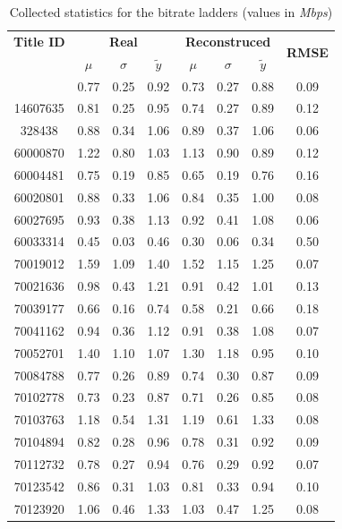 \begin{small}
\begin{longtable}{|c|c c c|c c c|c|}
    \caption{Collected statistics for the bitrate ladders (values in
    \emph{Mbps})}\label{tab:bitrate_ladders_stats}\\
\hline
\textbf{Title ID} &
\multicolumn{3}{c|}{\textbf{Real}} &
\multicolumn{3}{c|}{\textbf{Reconstruced}} &
\multirow{2}{*}{\textbf{RMSE}} \\
& $\mu$ & $\sigma$ & $\tilde{y}$ & $\mu$ & $\sigma$ & $\tilde{y}$ & \\
\hline
\endhead
\hline
\endfoot
1151721 & 0.77 & 0.25 & 0.92 & 0.73 & 0.27 & 0.88 & 0.09 \\
14607635 & 0.81 & 0.25 & 0.95 & 0.74 & 0.27 & 0.89 & 0.12 \\
328438 & 0.88 & 0.34 & 1.06 & 0.89 & 0.37 & 1.06 & 0.06 \\
60000870 & 1.22 & 0.80 & 1.03 & 1.13 & 0.90 & 0.89 & 0.12 \\
60004481 & 0.75 & 0.19 & 0.85 & 0.65 & 0.19 & 0.76 & 0.16 \\
60020801 & 0.88 & 0.33 & 1.06 & 0.84 & 0.35 & 1.00 & 0.08 \\
60027695 & 0.93 & 0.38 & 1.13 & 0.92 & 0.41 & 1.08 & 0.06 \\
\rowcolor{lightgray}60033314 & 0.45 & 0.03 & 0.46 & 0.30 & 0.06 & 0.34 & 0.50 \\
70019012 & 1.59 & 1.09 & 1.40 & 1.52 & 1.15 & 1.25 & 0.07 \\
70021636 & 0.98 & 0.43 & 1.21 & 0.91 & 0.42 & 1.01 & 0.13 \\
70039177 & 0.66 & 0.16 & 0.74 & 0.58 & 0.21 & 0.66 & 0.18 \\
70041162 & 0.94 & 0.36 & 1.12 & 0.91 & 0.38 & 1.08 & 0.07 \\
70052701 & 1.40 & 1.10 & 1.07 & 1.30 & 1.18 & 0.95 & 0.10 \\
70084788 & 0.77 & 0.26 & 0.89 & 0.74 & 0.30 & 0.87 & 0.09 \\
70102778 & 0.73 & 0.23 & 0.87 & 0.71 & 0.26 & 0.85 & 0.08 \\
70103763 & 1.18 & 0.54 & 1.31 & 1.19 & 0.61 & 1.33 & 0.08 \\
70104894 & 0.82 & 0.28 & 0.96 & 0.78 & 0.31 & 0.92 & 0.09 \\
70112732 & 0.78 & 0.27 & 0.94 & 0.76 & 0.29 & 0.92 & 0.07 \\
70123542 & 0.86 & 0.31 & 1.03 & 0.81 & 0.33 & 0.94 & 0.10 \\
70123920 & 1.06 & 0.46 & 1.33 & 1.03 & 0.47 & 1.25 & 0.08 \\

\end{longtable}
\end{small}
